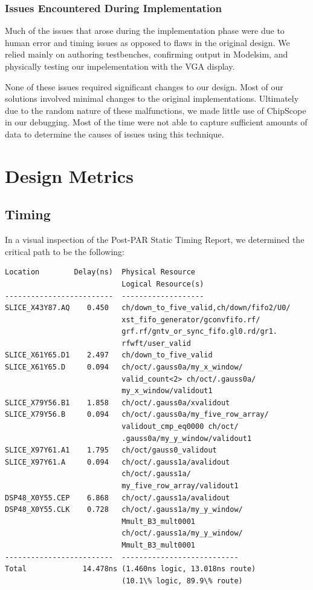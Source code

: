 \subsubsection{Issues Encountered During Implementation}

Much of the issues that arose during the implementation phase were due to 
human error and timing issues as opposed to flaws in the original design. We relied
mainly on authoring testbenches, confirming output in Modelsim, and physically 
testing our impelementation with the VGA display.

None of these issues required significant changes to our design. Most of our solutions
involved minimal changes to the original implementations. Ultimately 
due to the random nature of these malfunctions, we made little use of ChipScope in our
debugging. Most of the time were not able to capture sufficient amounts of 
data to determine the causes of issues using this technique.

\section{Design Metrics}

\subsection{Timing}

In a visual inspection of the Post-PAR Static Timing Report, we determined the critical path to be
the following:

\noindent \begin{lstlisting}
Location        Delay(ns)  Physical Resource
                           Logical Resource(s)
-------------------------  -------------------
SLICE_X43Y87.AQ    0.450   ch/down_to_five_valid,ch/down/fifo2/U0/
                           xst_fifo_generator/gconvfifo.rf/
                           grf.rf/gntv_or_sync_fifo.gl0.rd/gr1.
                           rfwft/user_valid
SLICE_X61Y65.D1    2.497   ch/down_to_five_valid
SLICE_X61Y65.D     0.094   ch/oct/.gauss0a/my_x_window/
                           valid_count<2> ch/oct/.gauss0a/
                           my_x_window/validout1
SLICE_X79Y56.B1    1.858   ch/oct/.gauss0a/xvalidout
SLICE_X79Y56.B     0.094   ch/oct/.gauss0a/my_five_row_array/
                           validout_cmp_eq0000 ch/oct/
                           .gauss0a/my_y_window/validout1
SLICE_X97Y61.A1    1.795   ch/oct/gauss0_validout
SLICE_X97Y61.A     0.094   ch/oct/.gauss1a/avalidout
                           ch/oct/.gauss1a/
                           my_five_row_array/validout1
DSP48_X0Y55.CEP    6.868   ch/oct/.gauss1a/avalidout
DSP48_X0Y55.CLK    0.728   ch/oct/.gauss1a/my_y_window/
                           Mmult_B3_mult0001
                           ch/oct/.gauss1a/my_y_window/
                           Mmult_B3_mult0001
-------------------------  ---------------------------
Total             14.478ns (1.460ns logic, 13.018ns route)
                           (10.1\% logic, 89.9\% route)
\end{lstlisting}

